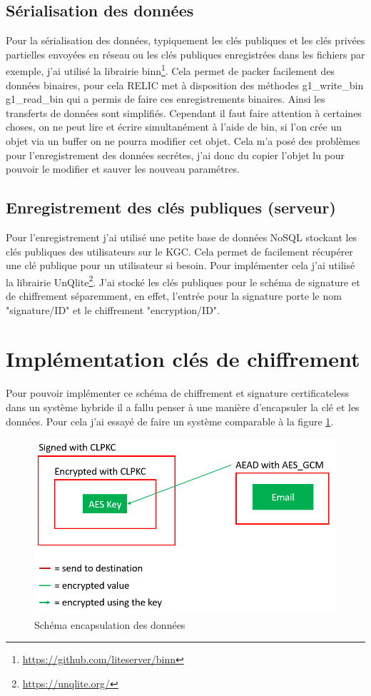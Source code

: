 \subsection{Sérialisation des données}
Pour la sérialisation des données, typiquement les clés publiques et les clés privées partielles envoyées en réseau ou les clés publiques enregistrées dans les fichiers par exemple, j'ai utilisé la librairie binn\footnote{\url{https://github.com/liteserver/binn}}. Cela permet de packer facilement des données binaires, pour cela RELIC met à disposition des méthodes g1\_write\_bin g1\_read\_bin qui a permis de faire ces enregistrements binaires. Ainsi les transferts de données sont simplifiés. Cependant il faut faire attention à certaines choses, on ne peut lire et écrire simultanément à l'aide de bin, si l'on crée un objet via un buffer on ne pourra modifier cet objet. Cela m'a posé des problèmes pour l'enregistrement des données secrétes, j'ai donc du copier l'objet lu pour pouvoir le modifier et sauver les nouveau paramétres.
\subsection{Enregistrement des clés publiques (serveur)}
Pour l'enregistrement j'ai utilisé une petite base de données NoSQL stockant les clés publiques des utilisateurs sur le KGC. Cela permet de facilement récupérer une clé publique pour un utilisateur si besoin. Pour implémenter cela j'ai utilisé la librairie UnQlite\footnote{\url{https://unqlite.org/}}. J'ai stocké les clés publiques pour le schéma de signature et de chiffrement séparemment, en effet, l'entrée pour la signature porte le nom "signature/ID" et le chiffrement "encryption/ID".
\section{Implémentation clés  de chiffrement}
Pour pouvoir implémenter ce schéma de chiffrement et signature certificateless dans un système hybride il a fallu penser à une manière d'encapsuler la clé et les données. Pour cela j'ai essayé de faire un système comparable à la figure \ref{fig:encapsulate}. 
\begin{figure}[h!]
	\centering
	\includegraphics[width=12cm]{images/schemaEncapsulation.png}
	\caption{Schéma encapsulation des données}
	\label{fig:encapsulate}
\end{figure}

